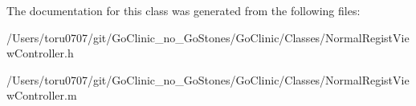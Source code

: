 The documentation for this class was generated from the following files:\begin{DoxyCompactItemize}
\item 
/Users/toru0707/git/GoClinic\_\-no\_\-GoStones/GoClinic/Classes/NormalRegistViewController.h\item 
/Users/toru0707/git/GoClinic\_\-no\_\-GoStones/GoClinic/Classes/NormalRegistViewController.m\end{DoxyCompactItemize}
